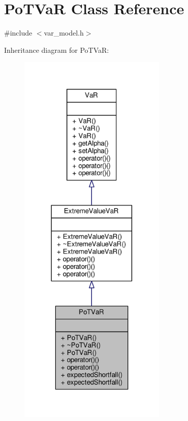 \hypertarget{classPoTVaR}{}\section{Po\+T\+VaR Class Reference}
\label{classPoTVaR}


{\ttfamily \#include $<$var\+\_\+model.\+h$>$}



Inheritance diagram for Po\+T\+VaR\+:
\nopagebreak
\begin{figure}[H]
\begin{center}
\leavevmode
\includegraphics[width=199pt]{classPoTVaR__inherit__graph}
\end{center}
\end{figure}


